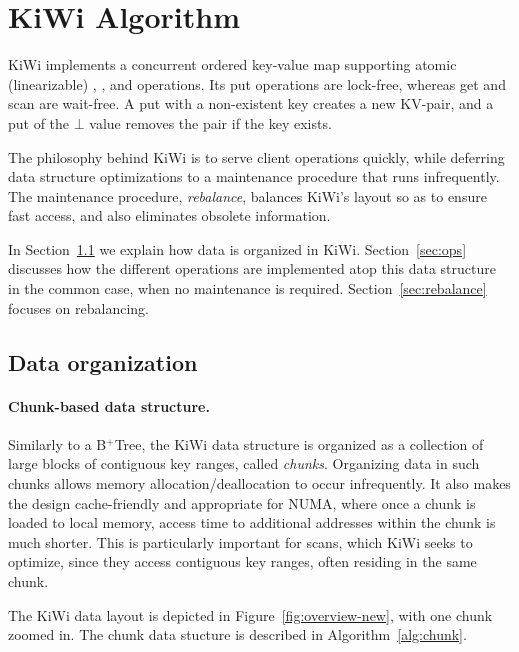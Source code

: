 \section{KiWi Algorithm}
\label{sec:alg}

KiWi implements a concurrent ordered key-value map supporting atomic (linearizable) , , and  operations.
Its put operations are lock-free, whereas get and scan are wait-free. A put with a non-existent key creates a new KV-pair, and a put of the $\bot$ value removes the pair if the key exists.

The philosophy behind KiWi is to serve client operations quickly, while deferring data structure optimizations to a
maintenance procedure that runs infrequently. The maintenance procedure, \emph{rebalance}, balances KiWi's layout so as to ensure fast
access, and also eliminates obsolete information.

In Section~\ref{sec:organization}  we explain how data is organized in KiWi.   Section~\ref{sec:ops} discusses how the different operations are implemented atop this data structure in the common case, 
when no maintenance is required.
Section~\ref{sec:rebalance} focuses on rebalancing.


\subsection{Data organization}
\label{sec:organization}

\paragraph{Chunk-based data structure.}
Similarly to a B$^{+}$Tree, the KiWi data structure is organized as a collection of large blocks of contiguous key ranges, called \emph{chunks}. Organizing data in such chunks allows memory allocation/deallocation to occur infrequently. It also makes the design cache-friendly and appropriate for NUMA, where once a chunk is loaded to local memory, access time to additional addresses within the chunk is much shorter. This is particularly important for  scans, which KiWi seeks to optimize, since they access contiguous key ranges, often residing in the same chunk.

The KiWi data layout is depicted in Figure~\ref{fig:overview-new}, with one chunk zoomed in.
The chunk data stucture is described in Algorithm~\ref{alg:chunk}.

